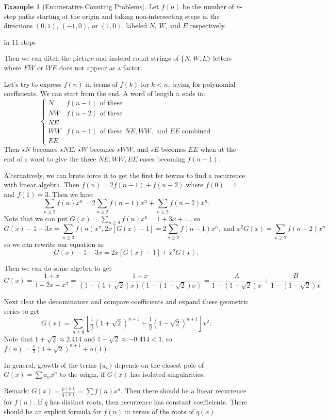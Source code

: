 \documentclass[12pt,letterpaper]{article}
\theoremstyle{definition}
\newtheorem{example}{Example}[section]
\begin{document}
	\begin{example}[Enumerative Counting Problems]
		Let $f(n)$ be the number of $n$-step paths starting at the origin and taking non-intersecting steps in the directions $(0,1)$, $(-1,0)$, or $(1,0)$, labeled $N$, $W$, and $E$ respectively.
		
		  in 11 steps
		
		Then we can ditch the picture and instead count strings of $\{N,W,E\}$-letters where $EW$ or $WE$ does not appear as a factor. 
		
		Let's try to express $f(n)$ in terms of $f(k)$ for $k < n$, trying for polynomial coefficients. We can start from the end. A word of length $n$ ends in: $$\begin{cases}
		N & f(n-1) \text{ of these}\\
		NW & f(n-2) \text{ of these}\\
		NE\\
		WW & f(n-1) \text{ of these } NE, WW, \text{ and } EE \text{ combined}\\
		EE
		\end{cases}$$
		Then $\star N$ becomes $\star NE$, $\star W$ becomes $\star WW$, and $\star E$ becomes $EE$ when at the end of a word to give the three $NE, WW, EE$ cases becoming $f(n-1)$. 
		
		Alternatively, we can brute force it to get the first fer tewms to find a recurrence with linear algebra. Then $f(n) = 2f(n-1) + f(n-2)$ where $f(0) = 1$ and $f(1) = 3$. Then we have \[\sum_{n\geq 2}f(n)x^n = 2\sum_{n\geq2} f(n-1)x^n + \sum_{n\geq 2} f(n-2)x^n.\] Note that we can put $G(x) = \sum_{n\geq 0} f(n) x^n = 1 + 3x + \ldots$, so \[G(x) - 1 - 3x = \sum_{n\geq 2}f(n)x^n, 2x[G(x) - 1] = 2\sum_{n\geq2} f(n-1)x^n, \text{ and } x^2G(x) = \sum_{n\geq 2} f(n-2)x^n\] so we can rewrite our equation as \[G(x) - 1 - 3x = 2x[G(x) - 1] + x^2 G(x).\]
		
		Then we can do some algebra to get \[G(x) = \frac{1+x}{1-2x-x^2} = \frac{1+x}{(1-(1+\sqrt{2})x)(1-(1-\sqrt{2})x)} = \frac{A}{1-(1+\sqrt{2})x} + \frac{B}{1-(1-\sqrt{2})x}\]
		
		Next clear the denominators and compare coefficients and expand these geometric series to get \[G(x) = \sum_{n\geq0}\left[\frac{1}{2}(1+\sqrt{2})^{n+1} + \frac{1}{2}(1-\sqrt{2})^{n+1}\right] x^2.\]
		Note that $1+\sqrt{2} \approx 2.414$ and $1- \sqrt{2} \approx -0.414 < 1$, so $f(n) = \frac{1}{2}(1+\sqrt{2})^{n+1} + o(1)$. 

	\end{example}		
In general, growth of the terms $\{a_n\}$ depends on the closest pole of $G(x) = \sum a_nx^n$ to the origin, if $G(x)$ has isolated singularities. 

Remark: $G(x) = \frac{p(x)}{q(x)} = \sum f(n)x^n$. Then there should be a linear recurrence for $f(n)$. If $q$ has distinct roots, then recurrence has constant coefficients. There should be an explicit formula for $f(n)$ in terms of the roots of $q(x)$. 
\end{document}

